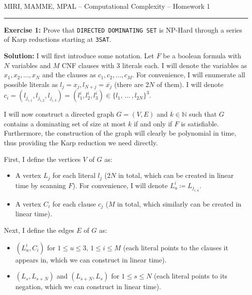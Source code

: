 \documentclass{amsart}
\theoremstyle{plain}
\theoremstyle{definition}
\newcommand{\N}{\mathbb{N}}
\begin{document}
    {\Large MIRI, MAMME, MPAL -- Computational Complexity -- Homework 1}

    \vspace{0.5cm}

    \hrule

    \vspace{0.5cm}

    \textbf{Exercise 1:} Prove that \verb|DIRECTED DOMINATING SET| is NP-Hard through a series of Karp reductions
    starting at \verb|3SAT|.

    \textbf{Solution:} I will first introduce some notation.
    Let $F$ be a boolean formula with $N$ variables and $M$ CNF
    clauses with $3$ literals each.
    I will denote the variables as $x_1, x_2, \ldots, x_N$ and the clauses as $c_1, c_2, \ldots, c_M$.
    For convenience, I will enumerate all possible literals as $l_j = x_j, l_{N+j} = \overline{x_j}$
    (there are $2N$ of them).
    I will denote
    $c_i = \left( l_{j_{i, 1}}, l_{j_{i, 2}}, l_{j_{i, 3}} \right) =
    \left( l^i_1, l^i_2, l^i_3 \right)
    \in \{l_1, \, \dots \, , l_{2N}\}^3$.

    I will now construct a directed graph $G = (V, E)$ and $k \in \N$ such that
    $G$ contains a dominating set of size at most $k$ if and only if $F$ is satisfiable.
    Furthermore, the construction of the graph will clearly be polynomial in time,
    thus providing the Karp reduction we need directly.

    First, I define the vertices $V$ of $G$ as:
    \begin{itemize}
        \item A vertex $L_j$ for each literal $l_j$ ($2N$ in total, which can be created in linear time by scanning $F$).
        For convenience, I will denote $L^i_u \coloneqq L_{j_{i, u}}$.

        \item A vertex $C_i$ for each clause $c_j$ ($M$ in total, which similarly can be created in linear time).

    \end{itemize}

    Next, I define the edges $E$ of $G$ as:
    \begin{itemize}
        \item $\left( L^i_u, C_i \right)$ for $1 \leq u \leq 3,\, 1 \leq i \leq M$
        (each literal points to the clauses it appears in, which we can construct in linear time).

        \item $\left( L_s, L_{s+N} \right)$ and $\left( L_{s+N}, L_{s} \right)$ for $1 \leq s \leq N$
        (each literal points to its negation, which we can construct in linear time).
    \end{itemize}
\end{document}
